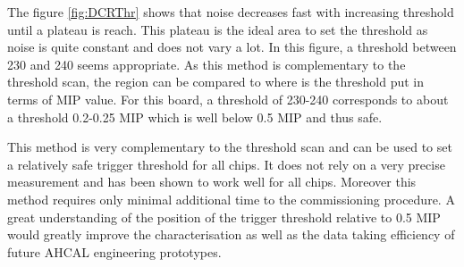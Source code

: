 The figure \ref{fig:DCRThr} shows that noise decreases fast with increasing threshold until a plateau is reach. This plateau is the ideal area to set the threshold as noise is quite constant and does not vary a lot. In this figure, a threshold between 230 and 240 seems appropriate. As this method is complementary to the threshold scan, the region can be compared to where is the threshold put in terms of MIP value. For this board, a threshold of 230-240 corresponds to about a threshold 0.2-0.25 MIP which is well below 0.5 MIP and thus safe.

This method is very complementary to the threshold scan and can be used to set a relatively safe trigger threshold for all chips. It does not rely on a very precise measurement and has been shown to work well for all chips. Moreover this method requires only minimal additional time to the commissioning procedure. A great understanding of the position of the trigger threshold relative to 0.5 MIP would greatly improve the characterisation as well as the data taking efficiency of future AHCAL engineering prototypes.
